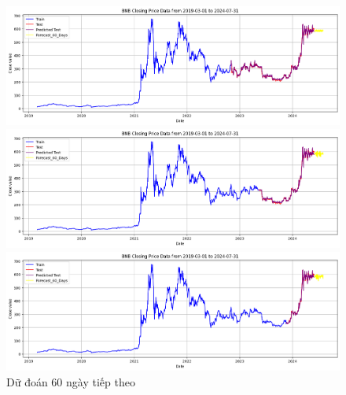 \documentclass[conference]{IEEEtran}
\begin{document}
	\begin{figure}[H]
		\centering
		\begin{minipage}{0.15\textwidth}
			\centering
			\includegraphics[width=1\textwidth]{Figure/RandomForest_BNB_60days_73.png}
		\end{minipage}
		\hfill
		\begin{minipage}{0.15\textwidth}
			\centering
			\includegraphics[width=1\textwidth]{Figure/RandomForest_BNB_60days_82.png}
		\end{minipage}
		\hfill
		\begin{minipage}{0.15\textwidth}
			\centering
			\includegraphics[width=1\textwidth]{Figure/RandomForest_BNB_60days_91.png}
		\end{minipage}
		\caption{Dữ đoán 60 ngày tiếp theo}
		\label{fig:1}
	\end{figure}
	
\end{document}
